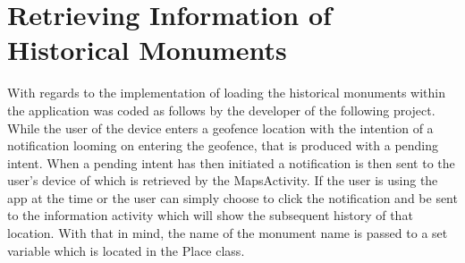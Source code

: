 \section{Retrieving Information of Historical Monuments}
With regards to the implementation of loading the historical monuments within the application was coded as follows by the developer of the following project. While the user of the device enters a geofence location with the intention of a notification looming on entering the geofence, that is produced with a pending intent. When a pending intent has then initiated a notification is then sent to the user's device of which is retrieved by the MapsActivity. If the user is using the app at the time or the user can simply choose to click the notification and be sent to the information activity which will show the subsequent history of that location. With that in mind, the name of the monument name is passed to a set variable which is located in the Place class.


